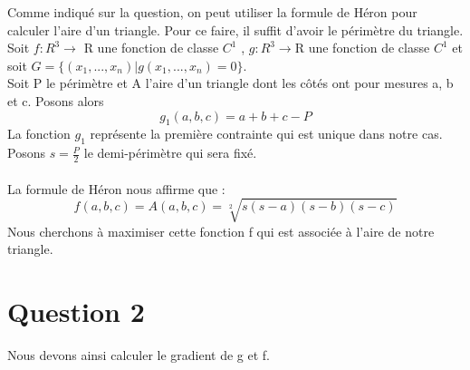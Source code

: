 \documentclass[12pt]{report}
\begin{document}
Comme indiqué sur la question, on peut utiliser la formule de Héron pour calculer l'aire d'un triangle.
Pour ce faire, il suffit d'avoir le périmètre du triangle.\\
\indent Soit $f:R^{3}\longrightarrow$ R une fonction de classe $C^{1}$ , $g:R^{3}\longrightarrow$R une fonction de classe
$C^{1}$ et soit $ G = \lbrace (x_{1},...,x_{n})\vert g(x_{1},...,x_{n})=0\rbrace.$\\
\indent Soit P le périmètre et A l'aire d'un triangle dont les côtés ont pour mesures a, b et c. Posons alors\\
\begin{equation}\label{eq:11}
   g_{1}(a,b,c) = a + b + c - P
\end{equation}
La fonction $g_{1}$ représente la première contrainte qui est unique dans notre cas.\\
Posons $s = \frac{P}{2}$ le demi-périmètre qui sera fixé.\\ \\
La formule de Héron nous affirme que :
\begin{equation}
   f(a,b,c) = A(a,b,c) = \sqrt[2]{s(s-a)(s-b)(s-c)}
\end{equation}
Nous cherchons à maximiser cette fonction f qui est associée à l'aire de notre triangle.\\


\clearpage
\section{Question 2}
Nous devons ainsi calculer le gradient de g et f.
\end{document}
